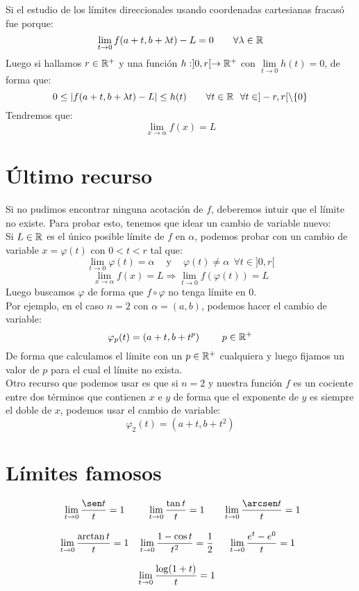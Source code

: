 Si el estudio de los límites direccionales usando coordenadas cartesianas fracasó fue porque:
$$\lim_{t \to 0}f(a + t, b + \lambda t)-L = 0~~~~~~\forall \lambda \in \mathbb R$$
Luego si hallamos $r \in \mathbb R^{+}$ y una función $h:]0,r[\rightarrow \mathbb R^{+}$ con $\lim\limits_{t\to 0}h(t) = 0$,
de forma que:
$$0 \leq |f(a+t,b+\lambda t)-L| \leq h(t)~~~~~~\forall t \in \mathbb R~~\forall t \in ]-r,r[\setminus\{0\}$$
Tendremos que: $$\lim_{x \to \alpha}f(x) = L$$

\section{Último recurso}

Si no pudimos encontrar ninguna acotación de $f$, deberemos intuir que el límite no existe.
Para probar esto, tenemos que idear un cambio de variable nuevo:\\


Si $L \in \mathbb R$ es el único posible límite de $f$ en $\alpha$, podemos probar con un cambio de variable
$x = \varphi(t)$ con $0 < t < r$ tal que:
$$\lim_{t \to 0}\varphi(t) = \alpha ~~~~\mbox{ y } ~~~~ \varphi(t) \neq \alpha ~~\forall t \in ]0,r[$$
$$\lim_{x \to \alpha}f(x) = L \Rightarrow \lim_{t \to 0}f(\varphi(t)) = L$$
Luego buscamos $\varphi$ de forma que $f \circ \varphi$ no tenga límite en 0.\\


Por ejemplo, en el caso $n=2$ con $\alpha = (a,b)$, podemos hacer el cambio de variable:
$$\varphi_p(t)=(a+t, b+t^p)~~~~~~~p \in \mathbb R^{+}$$
De forma que calculamos el límite con un $p \in \mathbb R^{+}$ cualquiera y luego fijamos un valor de $p$
para el cual el límite no exista.\\


Otro recurso que podemos usar es que si $n=2$ y nuestra función $f$ es un cociente entre dos
términos que contienen $x$ e $y$ de forma que el exponente de $y$ es siempre el doble de $x$, podemos
usar el cambio de variable:
$$\varphi_2(t) = (a+t,b+t^2)$$

\section{Límites famosos}
\begin{equation*}
    \begin{array}{ccc}
        \displaystyle \lim_{t \to 0}\dfrac{\sen t}{t} = 1
        &
        \displaystyle  \lim_{t \to 0}\dfrac{\tan t}{t} = 1
        &
        \displaystyle  \lim_{t \to 0}\dfrac{\arcsen t}{t} = 1\\ \\
        \displaystyle  \lim_{t \to 0}\dfrac{\arctan t}{t} = 1
        &
        \displaystyle  \lim_{t \to 0}\dfrac{1-\cos t}{t^2} = \dfrac{1}{2}
        & 
        \displaystyle  \lim_{t \to 0}\dfrac{e^t -e^0}{t} = 1\\ \\
        &\displaystyle  \lim_{t \to 0}\dfrac{\log(1+t)}{t}=1
    \end{array}
\end{equation*}

